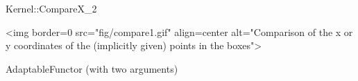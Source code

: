 \begin{ccRefFunctionObjectConcept}{Kernel::CompareX_2}
\begin{ccHtmlOnly}
<img border=0 src="fig/compare1.gif" align=center alt="Comparison of the x 
or y coordinates of the (implicitly given) points in the boxes">
\end{ccHtmlOnly} 

\ccRefines
AdaptableFunctor (with two arguments)

\ccSeeAlso
{}  \\

\end{ccRefFunctionObjectConcept}
